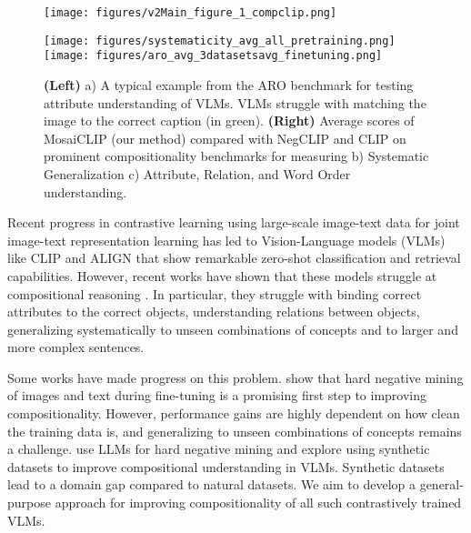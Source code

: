\documentclass[11pt]{article}
\newcommand{\methodcomp}{MosaiCLIP}
\newcommand{\clip}{CLIP}
\newcommand{\negclip}{NegCLIP}
\begin{document}
\begin{figure}[h!]
    \centering
    \begin{minipage}{0.53\columnwidth}
        \centering
        \texttt{[image: figures/v2Main\_figure\_1\_compclip.png]}
        \subcaption{}
    \end{minipage}
    \begin{minipage}{0.44\columnwidth}
        \centering
        \texttt{[image: figures/systematicity\_avg\_all\_pretraining.png]}
        \subcaption{}
        \texttt{[image: figures/aro\_avg\_3datasetsavg\_finetuning.png]}
        \subcaption{}
    \end{minipage}
    \caption{\textbf{(Left)} a) A typical example from the ARO benchmark for testing attribute understanding of VLMs. VLMs struggle with matching the image to the correct caption (in green). \textbf{(Right)} Average scores of \methodcomp{} (our method) compared with \negclip{} and \clip{} on prominent compositionality benchmarks for measuring b) Systematic Generalization c) Attribute, Relation, and Word Order understanding.}
    \label{fig:overview_results}
    \vspace{-0.5cm}
\end{figure}

Recent progress in contrastive learning using large-scale image-text data for joint image-text representation learning has led to Vision-Language models (VLMs) like CLIP \citep{radford2021learning} and ALIGN \citep{jia2021scaling} that show remarkable zero-shot classification and retrieval capabilities. However, recent works have shown that these models struggle at compositional reasoning \cite{yuksekgonul2022and, thrush2022winoground, ma2022crepe}. In particular, they struggle with binding correct attributes to the correct objects, understanding relations between objects, generalizing systematically to unseen combinations of concepts and to larger and more complex sentences.

Some works have made progress on this problem. \citet{yuksekgonul2022and} show that hard negative mining of images and text during fine-tuning is a promising first step to improving compositionality. However, performance gains are highly dependent on how clean the training data is, and generalizing to unseen combinations of concepts remains a challenge. \citet{doveh2023teaching} use LLMs for hard negative mining and \citet{cascantebonilla2023going} explore using synthetic datasets to improve compositional understanding in VLMs. Synthetic datasets lead to a domain gap compared to natural datasets. We aim to develop a general-purpose approach for improving compositionality of all such contrastively trained VLMs.
\end{document}

